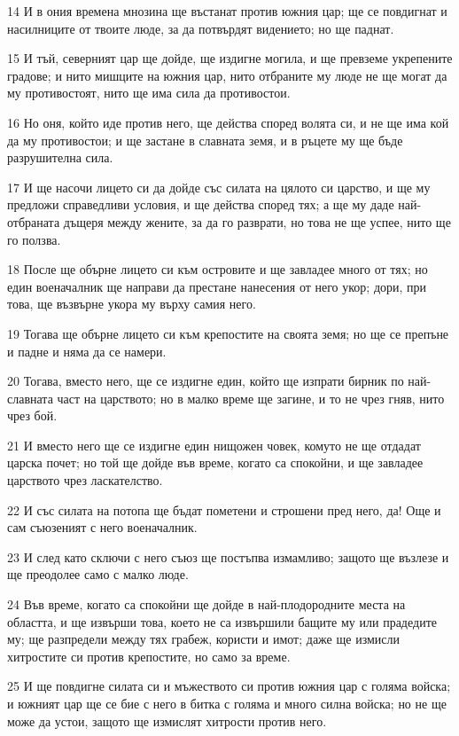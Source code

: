 \par 14 И в ония времена мнозина ще въстанат против южния цар; ще се повдигнат и насилниците от твоите люде, за да потвърдят видението; но ще паднат.
\par 15 И тъй, северният цар ще дойде, ще издигне могила, и ще превземе укрепените градове; и нито мишците на южния цар, нито отбраните му люде не ще могат да му противостоят, нито ще има сила да противостои.
\par 16 Но оня, който иде против него, ще действа според волята си, и не ще има кой да му противостои; и ще застане в славната земя, и в ръцете му ще бъде разрушителна сила.
\par 17 И ще насочи лицето си да дойде със силата на цялото си царство, и ще му предложи справедливи условия, и ще действа според тях; а ще му даде най-отбраната дъщеря между жените, за да  го разврати, но това не ще успее, нито ще го ползва.
\par 18 После ще обърне лицето си към островите и ще завладее много от тях; но един военачалник ще направи да престане нанесения от него укор; дори, при това, ще възвърне укора му върху самия него.
\par 19 Тогава ще обърне лицето си към крепостите на своята земя; но ще се препъне и падне и няма да се намери.
\par 20 Тогава, вместо него, ще се издигне един, който ще изпрати бирник по най-славната част на царството; но в малко време ще загине, и то не чрез гняв, нито чрез бой.
\par 21 И вместо него ще се издигне един нищожен човек, комуто не ще отдадат царска почет; но той ще дойде във време, когато са спокойни, и ще завладее царството чрез ласкателство.
\par 22 И със силата на потопа ще бъдат пометени и строшени пред него, да! Още и сам съюзеният с него военачалник.
\par 23 И след като сключи с него съюз ще постъпва измамливо; защото ще възлезе и ще преодолее само с малко люде.
\par 24 Във време, когато са спокойни ще дойде в най-плодородните места на областта, и ще извърши това, което не са извършили бащите му или прадедите му; ще разпредели между тях грабеж, користи и имот; даже ще измисли хитростите си против крепостите, но само за време.
\par 25 И ще повдигне силата си и мъжеството си против южния цар с голяма войска; и южният цар ще се бие с него в битка с голяма и много силна войска; но не ще може да устои, защото ще измислят хитрости против него.
